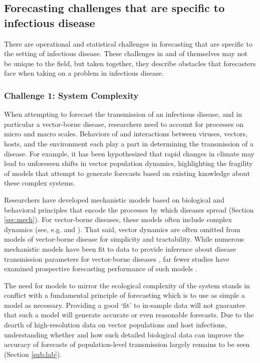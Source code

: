 \documentclass[a4paper]{article}
\begin{document}
\subsection{Forecasting challenges that are specific to infectious disease} \label{sec:challenges}

There are operational and statistical challenges in forecasting that are specific to the setting of infectious disease.
These challenges in and of themselves may not be unique to the field, but taken together, they describe obstacles that forecasters face when taking on a problem in infectious disease.

\subsubsection*{Challenge 1: System Complexity}

When attempting to forecast the transmission of an infectious disease, and in particular a vector-borne disease, researchers need to account for processes on micro and macro scales.
Behaviors of and interactions between viruses, vectors, hosts, and the environment each play a part in determining the transmission of a disease.
For example, it has been hypothesized that rapid changes in climate may lead to unforeseen shifts in vector population dynamics, highlighting the fragility of models that attempt to generate forecasts based on existing knowledge about these complex systems.\cite{mandal2011mathematical,jewell2015bayesian,ostfeld2015climate} 

Researchers have developed mechanistic models based on biological and behavioral principles that encode the processes by which diseases spread (Section \ref{sec:mech}).
For vector-borne diseases, these models often include complex dynamics (see, e.g. \cite{mandal2011mathematical} and \cite{reiner2013systematic}).
That said, vector dynamics are often omitted from models of vector-borne disease for simplicity and tractability.\cite{reiner2013systematic}
While numerous mechanistic models have been fit to data to provide inference about disease transmission parameters for vector-borne diseases \cite{lourencco20142012,reiner2013systematic}, far fewer studies have examined prospective forecasting performance of such models \cite{Defelice2017,jewell2015bayesian}.

The need for models to mirror the ecological complexity of the system stands in conflict with a fundamental principle of forecasting which is to use as simple a model as necessary.
Providing a good `fit' to in-sample data will not guarantee that such a model will generate accurate or even reasonable forecasts.
Due to the dearth of high-resolution data on vector populations and host infections, understanding whether and how such detailed biological data can improve the accuracy of forecasts of population-level transmission largely remains to be seen (Section \ref{sub:lab}).
\end{document}
